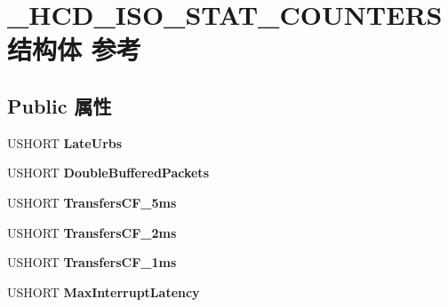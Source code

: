 \hypertarget{struct___h_c_d___i_s_o___s_t_a_t___c_o_u_n_t_e_r_s}{}\section{\+\_\+\+H\+C\+D\+\_\+\+I\+S\+O\+\_\+\+S\+T\+A\+T\+\_\+\+C\+O\+U\+N\+T\+E\+R\+S结构体 参考}
\label{struct___h_c_d___i_s_o___s_t_a_t___c_o_u_n_t_e_r_s}
\subsection*{Public 属性}
\begin{DoxyCompactItemize}
\item 
\mbox{\label{struct___h_c_d___i_s_o___s_t_a_t___c_o_u_n_t_e_r_s_abb7de7e4eb70f142e4ea845024a34c85}} 
U\+S\+H\+O\+RT {\bfseries Late\+Urbs}
\item 
\mbox{\label{struct___h_c_d___i_s_o___s_t_a_t___c_o_u_n_t_e_r_s_aa8158cc8ad17c8cd37290ff0db35c487}} 
U\+S\+H\+O\+RT {\bfseries Double\+Buffered\+Packets}
\item 
\mbox{\label{struct___h_c_d___i_s_o___s_t_a_t___c_o_u_n_t_e_r_s_a4ad1a9151b26bfb6464dab37356792e7}} 
U\+S\+H\+O\+RT {\bfseries Transfers\+C\+F\+\_\+5ms}
\item 
\mbox{\label{struct___h_c_d___i_s_o___s_t_a_t___c_o_u_n_t_e_r_s_aff88bd45640b3bfb441abf3f164fa92c}} 
U\+S\+H\+O\+RT {\bfseries Transfers\+C\+F\+\_\+2ms}
\item 
\mbox{\label{struct___h_c_d___i_s_o___s_t_a_t___c_o_u_n_t_e_r_s_a206f7caa2214e3db1f267e74b2a98229}} 
U\+S\+H\+O\+RT {\bfseries Transfers\+C\+F\+\_\+1ms}
\item 
\mbox{\label{struct___h_c_d___i_s_o___s_t_a_t___c_o_u_n_t_e_r_s_adbed7518901d8e80adc5b791ce1b5e64}} 
U\+S\+H\+O\+RT {\bfseries Max\+Interrupt\+Latency}
\item 

\end{DoxyCompactItemize}
